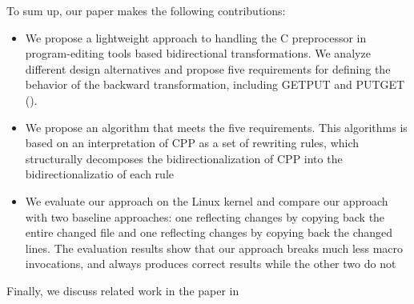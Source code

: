 To sum up, our paper makes the following contributions:
\begin{itemize}
\item We propose a lightweight approach to handling the C preprocessor
  in program-editing tools based bidirectional transformations. We
  analyze different design alternatives and propose five requirements
  for defining the behavior of the backward transformation, including
  GETPUT and PUTGET
  ().
\item We propose an algorithm that meets the five requirements. This
  algorithms is based on an interpretation of CPP as a set of
  rewriting rules, which structurally decomposes the
  bidirectionalization of CPP
  into the bidirectionalizatio of each rule %
\item We evaluate our approach on the Linux kernel and compare
  our approach with two baseline approaches: one reflecting 
  changes by copying back the entire changed file and one reflecting
   changes by copying back the changed lines. The evaluation results show
  that our approach breaks much less macro invocations, and always produces correct results while the other two
  do not %
\end{itemize}


Finally, we discuss related work in %
the paper in %